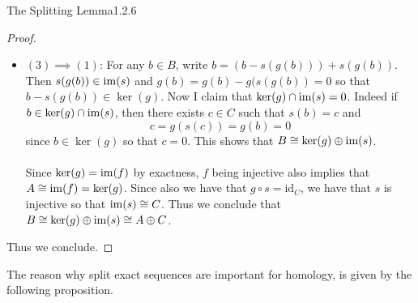 \documentclass[a4paper]{article}
\begin{document}
\begin{thm}{The Splitting Lemma}{1.2.6}
\begin{proof}
\begin{itemize}
Consider the restricted $g|_{\ker(p)}:\ker(p)\to C$. I want to show that $g$ is an isomorphism. Let $b\in\ker\left(g|_{\ker(p)}\right)$. By exactness, there exists $a\in A$ such that $f(a)=b$. Then $a=p(f(a))=p(b)=0$ since $b\in\ker(p)$. Thus $b=f(0)=0$ so that $b\in\ker\left(g|_{\ker(p)}\right)$. For surjectivity, let $c\in C$. By exactness, $g$ is surjective so there exists $b\in B$ such that $g(b)=c$. Since $B\cong\ker(p)\oplus\im(f)$, we can write $b=f(a)+k$ for some $a\in A$ and $k\in\ker(p)$. Then we have that $$c=g(b)=g(f(a)+k)=g(k)$$ which means that there exists $k\in\ker(p)$ such that $g|_{\ker(p)}(k)=c$. Thus $\ker(p)\cong C$. Since $f$ is injective, $im(f)=f(A)\cong A$. Thus we have that $B\cong\im(f)\oplus\ker(p)\cong A\oplus C$. 

\item $(3)\implies(1)$: For any $b\in B$, write $b=(b-s(g(b)))+s(g(b))$. Then $s(g(b))\in\operatorname{im}(s)$ and $g(b)=g(b)-g(s(g(b))=0$ so that $b-s(g(b))\in\ker(g)$. Now I claim that $\ker(g)\cap\operatorname{im}(s)=0$. Indeed if $b\in\ker(g)\cap\operatorname{im}(s)$, then there exists $c\in C$ such that $s(b)=c$ and $$c=g(s(c))=g(b)=0$$ since $b\in\ker(g)$ so that $c=0$. This shows that $B\cong\ker(g)\oplus\operatorname{im}(s)$. \\~\\

Since $\ker(g)=\operatorname{im}(f)$ by exactness, $f$ being injective also implies that $A\cong\operatorname{im}(f)=\ker(g)$. Since also we have that $g\circ s=\text{id}_C$, we have that $s$ is injective so that $\operatorname{im}(s)\cong C$. Thus we conclude that $B\cong\ker(g)\oplus\operatorname{im}(s)\cong A\oplus C$. 
\end{itemize}
Thus we conclude. 
\end{proof}
\end{thm}

The reason why split exact sequences are important for homology, is given by the following proposition. 
\end{document}

